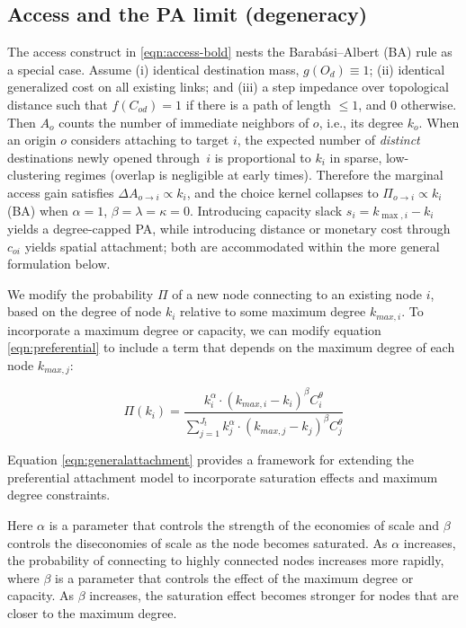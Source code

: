\documentclass{article}[12pt]
\begin{document}
\subsection{Access and the PA limit (degeneracy)}
The access construct in \autoref{eqn:access-bold} nests the Barab\'asi--Albert (BA) rule as a special case.
Assume (i) identical destination mass, $g(O_d)\equiv 1$; (ii) identical generalized cost on all existing links; and (iii) a step impedance over topological distance such that $f(C_{od})=1$ if there is a path of length $\le 1$, and $0$ otherwise. Then $A_o$ counts the number of immediate neighbors of $o$, i.e., its degree $k_o$.
When an origin $o$ considers attaching to target $i$, the expected number of \emph{distinct} destinations newly opened through~$i$ is proportional to $k_i$ in sparse, low-clustering regimes (overlap is negligible at early times). Therefore the marginal access gain satisfies $\Delta A_{o\to i}\propto k_i$, and the choice kernel collapses to $\Pi_{o\to i}\propto k_i$ (BA) when $\alpha=1$, $\beta=\lambda=\kappa=0$. Introducing capacity slack $s_i=k_{\max,i}-k_i$ yields a degree-capped PA, while introducing distance or monetary cost through $c_{oi}$ yields spatial attachment; both are accommodated within the more general formulation below.


We modify the probability $\Pi$ of a new node connecting to an existing node $i$, based on the degree of node $k_{i}$ relative to some maximum degree $k_{max,i}$. To incorporate a maximum degree or capacity, we can modify equation \ref{eqn:preferential} to include a term that depends on the maximum degree of each node $k_{max,j}$:

\begin{equation}
\Pi(k_{i}) = \frac{ k_{i}^{\alpha} \cdot (k_{max,i} - k_{i})^{\beta} {C_{i}^{\theta }} }
{ \sum_{j=1}^{J_{t}} k_{j}^{\alpha} \cdot (k_{max,j} - k_{j})^{\beta} { C_{j}^{\theta}} } 
\label{eqn:generalattachment}
\end{equation}

Equation \ref{eqn:generalattachment} provides a framework for extending the preferential attachment model to incorporate saturation effects and maximum degree constraints.

Here $\alpha$ is a parameter that controls the strength of the economies of scale and $\beta$ controls the diseconomies of scale as the node becomes saturated. As $\alpha$ increases, the probability of connecting to highly connected nodes increases more rapidly, where $\beta$  is a parameter that controls the effect of the maximum degree or capacity. As $\beta$ increases, the saturation effect becomes stronger for nodes that are closer to the maximum degree. 
\end{document}
